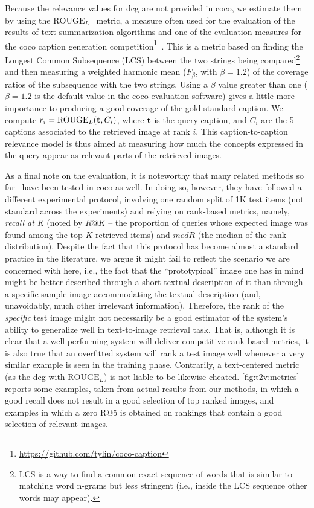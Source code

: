 Because the relevance values for \gls{dcg} are not provided in \gls{coco}, we estimate them by using the $\text{ROUGE}_L$~\cite{lin2004rouge} metric, a measure often used for the evaluation of the results of text summarization algorithms and one of the evaluation measures for the \gls{coco} caption generation competition\footnote{\url{https://github.com/tylin/coco-caption}}~\cite{chen2015microsoft}.
This is a metric based on finding the Longest Common Subsequence (LCS) between the two strings being compared\footnote{LCS is a way to find a common exact sequence of words that is similar to matching word n-grams but less stringent (i.e.,  inside the LCS sequence other words may appear).} and then measuring a weighted harmonic mean ($F_\beta$, with $\beta=1.2$) of the coverage ratios of the subsequence with the two strings.
Using a $\beta$ value greater than one ($\beta=1.2$ is the default value in the \gls{coco} evaluation software) gives a little more importance to producing a good coverage of the gold standard caption.
We compute $r_i = \text{ROUGE}_L ( \mathbf{t}, C_i ) $, where $\mathbf{t}$ is the query caption, and $C_i$ are the 5 captions associated to the retrieved image at rank $i$.
This caption-to-caption relevance model is thus aimed at measuring how much the concepts expressed in the query appear as relevant parts of the retrieved images.

As a final note on the evaluation, it is noteworthy that many related methods so far~\cite{mao2014deep,ma2015multimodal,klein2014fisher,karpathy2015deep,donahue2015long,kiros2015skip,wang2016learning} have been tested in \gls{coco} as well.
In doing so, however, they have followed a different experimental protocol, involving one random split of 1K test items (not standard across the experiments) and relying on rank-based metrics, namely, \emph{recall at K} (noted by $R@K$ -- the proportion of queries whose expected image was found among the top-$K$ retrieved items) and $medR$ (the median of the rank distribution).
Despite the fact that this protocol has become almost a standard practice in the literature, we argue it might fail to reflect the scenario we are concerned with here, i.e.,  the fact that the ``prototypical'' image one has in mind might be better described through a short textual description of it than through a specific sample image accommodating the textual description (and, unavoidably, much other irrelevant information).
Therefore, the rank of the \emph{specific} test image might not necessarily be a good estimator of the system's ability to generalize well in text-to-image retrieval task.
That is, although it is clear that a well-performing system will deliver competitive rank-based metrics, it is also true that an overfitted system will rank a test image well whenever a very similar example is seen in the training phase.
Contrarily, a text-centered metric (as the \gls{dcg} with $\text{ROUGE}_L$) is not liable to be likewise cheated.
\ref{fig:t2v:metrics} reports some examples, taken from actual results from our methods, in which a good recall does not result in a good selection of top ranked images, and examples in which a zero R@5 is obtained on rankings that contain a good selection of relevant images.

